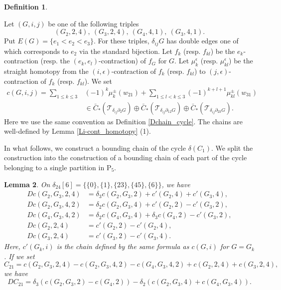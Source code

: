 \documentclass[reqno]{amsart}
\theoremstyle{definition}
\newtheorem{defi}{Definition}[section]
\theoremstyle{plain}
\newtheorem{lem}[defi]{Lemma}
\newcommand{\eps}{\epsilon}
\newcommand{\TT}{\mathcal{T}} %
\newcommand{\PP}{\mathrm{P}} %
\begin{document}
\begin{defi}\label{D2nd_chain_2contractions}

 Let $(G,i,j)$ be one of the following triples
\[
(G_2,2,4),\ 
(G_3,2,4),\ 
(G_4,4,1),\
(G_3,4,1).
\]
Put $E(G)=\{e_1<e_2<e_3\}$. For these triples, 
 $\delta_{ij}G$ has double edges one of which corresponds to $e_2$ via the standard bijection.
Let $f_k$ (resp. $f_{kl}$) be the $e_k$-contraction (resp. the $(e_k,e_l)$-contraction) of $f_G$ for $G$.
Let $\mu^{\eps}_k$ (resp. $\mu^{\eps}_{kl}$) be the straight homotopy  from the $(i,\eps)$-contraction of $f_k$ (resp. $f_{kl}$) to $(j,\eps)$-contraction of $f_k$ (resp. $f_{kl}$). 
We set
\[
\begin{split}
c(G,i,j)=\sum_{1\leq k\leq 3}&(-1)^{k}\mu^\pm_k(w_{21})+\sum_{1\leq l<k\leq 3}(-1)^{k+l+1}\mu^\pm_{kl}(w_{31}) \\
&\in \bar C_*(\TT_{\delta_{ij}\partial_{2} G})\oplus \bar C_*(\TT_{\delta_{ij}\partial_{12}G})\oplus\bar C_*(\TT_{\delta_{ij}\partial_{23}G}).
\end{split}
\]
Here we use the same convention as Definition \ref{Dchain_cycle}. The chains are well-defined by Lemma \ref{Li-cont_homotopy} (1).
\end{defi}
In what follows, we construct a bounding chain of the cycle $\delta (C_1)$.  We split the construction into the construction of a  bounding chain of  each part of the cycle belonging to a single partition in $\PP_5$.   
\begin{lem}\label{L2nd_bound_2,4}
On $\delta_{24}[6]=\{\{0\},\{1\},\{23\},\{45\},\{6\}\}$, we have
\[
\begin{split}
Dc(G_2, G_3,2,4)& =\delta_3c(G_2,G_3,2)+c'(G_2,4)+c'(G_3,4), \\
Dc(G_2, G_3,4,2)& =\delta_2c(G_2,G_3,4)+c'(G_2,2)-c'(G_3,2), \\
Dc(G_4, G_3,4,2)& =\delta_2c(G_4,G_3,4)+\delta_3c(G_4,2)-c'(G_3,2), \\
Dc(G_2,2,4)&=c'(G_2,2)-c'(G_2,4),\\
Dc(G_3,2,4)&=c'(G_3,2)-c'(G_3,4).
\end{split}
\]
Here, $c'(G_k,i)$ is the chain defined by the same formula as $c(G,i)$ for $G=G_k$.
If we set
\[
C_{21}=c(G_2,G_3,2,4)-c(G_2,G_3,4,2)-c(G_4,G_3,4,2)+c(G_2,2,4)+c(G_3,2,4),
\]
we have 
\[
DC_{21}=\delta_3(c(G_2,G_3,2)-c(G_4,2))-\delta_2(c(G_2,G_3,4)+c(G_4,G_3,4)).
\]
\hfill 
\end{lem}
\end{document}
